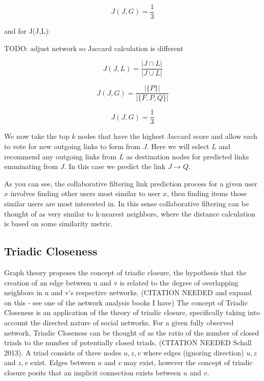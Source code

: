 \begin{equation}
\label{jaccard}
J(J,G) = \frac{1}{3}
\end{equation}

and for J(J,L):

TODO: adjust network so Jaccard calculation is different

\begin{equation}
\label{jaccard}
J(J,L) = \frac{|J \cap L|}{|J \cup L|}
\end{equation}

\begin{equation}
\label{jaccard}
J(J,G) = \frac{|\{P\}|}{|\{F, P, Q\}|}
\end{equation}

\begin{equation}
\label{jaccard}
J(J,G) = \frac{1}{3}
\end{equation}

We now take the top $k$ nodes that have the highest Jaccard score and allow each to vote for new outgoing links to form from $J$. Here we will select $L$ and recommend any outgoing links from $L$ as destination nodes for predicted links emminating from $J$. In this case we predict the link $J \rightarrow Q$.

As you can see, the collaborative filtering link prediction process for a given user $x$ involves finding other users most similar to user $x$, then finding items those similar users are most interested in. In this sense collaborative filtering can be thought of as very similar to k-nearest neighbors, where the distance calculation is based on some similarity metric.




\subsection{Triadic Closeness}
Graph theory proposes the concept of triadic closure, the hypothesis that the creation of an edge between u and v is related to the degree of overlapping neighbors in u and v's respective networks. (CITATION NEEDED and expand on this - see one of the network analysis books I have) The concept of Triadic Closeness is an application of the theory of triadic closure, specifically taking into account the directed nature of social networks. For a given fully observed network, Triadic Closeness can be thought of as the ratio of the number of closed triads to the number of potentially closed triads. (CITATION NEEDED Schall 2013). A triad consists of three nodes $u, z, v$ where edges (ignoring direction) $u,z$ and $z,v$ exist. Edges between $u$ and $v$ may exist, however the concept of triadic closure posits that an implicit connection exists between $u$ and $v$.

